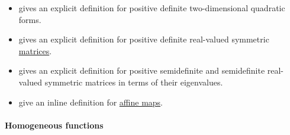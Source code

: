 \begin{remark}
\begin{itemize}
    \item \Textcite[295]{Тагамлицки1971ДиференциалноСмятане} gives an explicit definition for positive definite two-dimensional quadratic forms.

    \item \Textcite[def. 6.5.1]{Savage2008ModelsOfComputation} gives an explicit definition for positive definite real-valued symmetric \hyperref[def:array/matrix]{matrices}.

    \item \Textcite[246]{Strang2023LinearAlgebra} gives an explicit definition for positive semidefinite and semidefinite real-valued symmetric matrices in terms of their eigenvalues.

    \item \Textcite[59]{DontchevRockafellar2014SolutionMappings} give an inline definition for \hyperref[def:affine_operator]{affine maps}.
  \end{itemize}
\end{remark}

\paragraph{Homogeneous functions}

